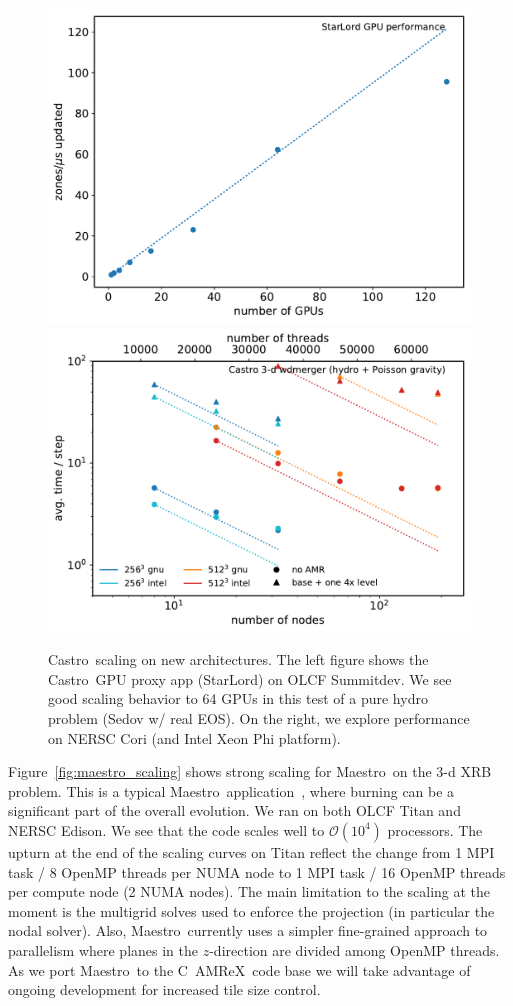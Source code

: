 \documentclass[a4paper]{jpconf}
\newcommand{\maestro}{{\sffamily Maestro}}
\newcommand{\castro}{{\sffamily Castro}}
\newcommand{\starlord}{{\sffamily StarLord}}
\newcommand{\amrex}{{\sffamily AMReX}}
\newcommand{\cpp}{C\nolinebreak\hspace{-.05em}\raisebox{.4ex}{\tiny\bf +}\nolinebreak\hspace{-.10em}\raisebox{.4ex}{\tiny\bf +}}
\begin{document}
\begin{figure}[t]
\centering
\includegraphics[width=0.48\linewidth]{summitdev_scaling}
\includegraphics[width=0.48\linewidth]{cori_scaling}
\caption{\label{fig:knl-gpu-scaling} \castro\ scaling on new
  architectures.  The left figure shows the \castro\ GPU proxy app
  (\starlord) on OLCF Summitdev.  We see good scaling behavior to 64
  GPUs in this test of a pure hydro problem (Sedov w/ real EOS).  On the
right, we explore performance on NERSC Cori (and Intel Xeon Phi platform).}
\end{figure}

Figure~\ref{fig:maestro_scaling} shows strong scaling for \maestro\ on
the 3-d XRB problem.  This is a typical
\maestro\ application~\cite{xrb3}, where burning can be a significant
part of the overall evolution.  We ran on both OLCF Titan and NERSC
Edison.  We see that the code scales well to $\mathcal{O}(10^4)$
processors.  The upturn at the end of the scaling curves on Titan
reflect the change from 1 MPI task / 8 OpenMP threads per NUMA node to
1 MPI task / 16 OpenMP threads per compute node (2 NUMA nodes).  The
main limitation to the scaling at the moment is the multigrid solves
used to enforce the projection (in particular the nodal solver).
Also, \maestro\ currently uses a simpler fine-grained approach to parallelism
where planes in the $z$-direction are divided among OpenMP threads.
As we port \maestro\ to the \cpp\ \amrex\ code base we will take
advantage of ongoing development for increased tile size control.
\end{document}
